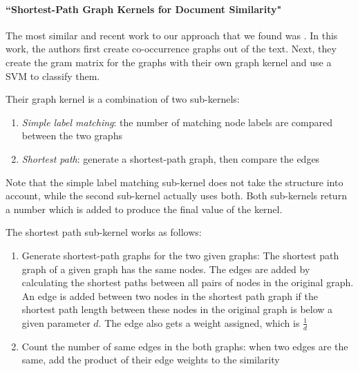 
\paragraph{``Shortest-Path Graph Kernels for Document Similarity" \cite{Nikolentzos2017a}}
The most similar and recent work to our approach that we found was \cite{Nikolentzos2017a}. In this work, the authors first create co-occurrence graphs out of the text. Next, they create the gram matrix for the graphs with their own graph kernel and use a SVM to classify them.

Their graph kernel is a combination of two sub-kernels:
\begin{enumerate}
    \item{\textit{Simple label matching}: the number of matching node labels are compared between the two graphs}
    \item{\textit{Shortest path}: generate a shortest-path graph, then compare the edges}
\end{enumerate}
Note that the simple label matching sub-kernel does not take the structure into account, while the second sub-kernel actually uses both.
Both sub-kernels return a number which is added to produce the final value of the kernel.

The shortest path sub-kernel works as follows:
\begin{enumerate}
    \item{Generate shortest-path graphs for the two given graphs: The shortest path graph of a given graph has the same nodes.
    The edges are added by calculating the shortest paths between all pairs of nodes in the original graph. An edge is added between two nodes in the shortest path graph if the shortest path length between these nodes in the original graph is below a given parameter $d$. The edge also gets a weight assigned, which is $\frac{1}{d}$}
    \item{Count the number of same edges in the both graphs: when two edges are the same, add the product of their edge weights to the similarity}
\end{enumerate}


